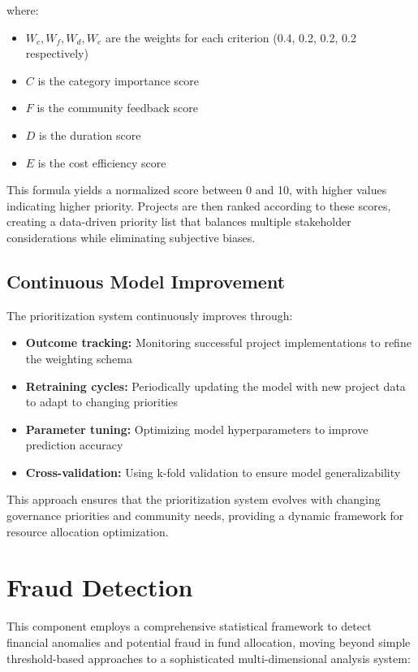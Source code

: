 \documentclass[12pt,a4paper]{report}
\begin{document}
\noindent where:
\begin{itemize}
    \item $W_c, W_f, W_d, W_e$ are the weights for each criterion (0.4, 0.2, 0.2, 0.2 respectively)
    \item $C$ is the category importance score
    \item $F$ is the community feedback score
    \item $D$ is the duration score
    \item $E$ is the cost efficiency score
\end{itemize}

\noindent This formula yields a normalized score between 0 and 10, with higher values indicating higher priority. Projects are then ranked according to these scores, creating a data-driven priority list that balances multiple stakeholder considerations while eliminating subjective biases.

\subsection{Continuous Model Improvement}
\indent \indent The prioritization system continuously improves through:

\begin{itemize}
    \item \textbf{Outcome tracking:} Monitoring successful project implementations to refine the weighting schema
    \item \textbf{Retraining cycles:} Periodically updating the model with new project data to adapt to changing priorities
    \item \textbf{Parameter tuning:} Optimizing model hyperparameters to improve prediction accuracy
    \item \textbf{Cross-validation:} Using k-fold validation to ensure model generalizability
\end{itemize}

\noindent This approach ensures that the prioritization system evolves with changing governance priorities and community needs, providing a dynamic framework for resource allocation optimization.

\section{Fraud Detection}
\indent \indent This component employs a comprehensive statistical framework to detect financial anomalies and potential fraud in fund allocation, moving beyond simple threshold-based approaches to a sophisticated multi-dimensional analysis system:
\end{document}
